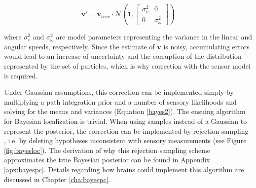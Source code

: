 \begin{equation}\label{veq}
\bm v' = \bm v_{true} \cdot \mathcal{N}(\bm 1, \begin{bmatrix}\sigma_v^2 & 0\\ 0 & \sigma_\omega^2\end{bmatrix})
\end{equation}

\noindent where $ \sigma_v^2 $ and $ \sigma_\omega^2 $ are model parameters representing the variance in the linear and angular speeds, respectively. Since the estimate of $\bm v$ is noisy, accumulating errors would lead to an increase of uncertainty and the corruption of the distribution represented by the set of particles, which is why correction with the sensor model is required. 

Under Gaussian assumptions, this correction can be implemented simply by multiplying a path integration prior and a number of sensory likelihoods and solving for the means and variances (Equation \ref{bayes2}). The ensuing algorithm for Bayesian localization is trivial. When using samples instead of a Gaussian to represent the posterior, the correction can be implemented by rejection sampling \citep{doucet2000sequential}, i.e. by deleting hypotheses inconsistent with sensory measurements (see Figure \ref{fig:bayesloc}). The derivation of why this rejection sampling scheme approximates the true Bayesian posterior can be found in Appendix \ref{apx:bayespc}. Details regarding how brains could implement this algorithm are discussed in Chapter \ref{cha:bayespc}.

